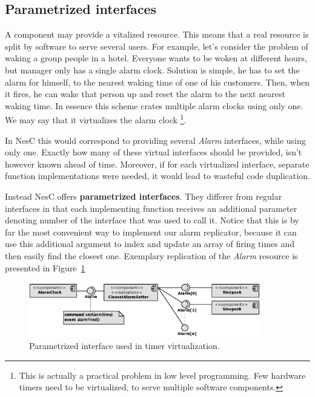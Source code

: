 \subsection{Parametrized interfaces}
A component may provide a vitalized resource. This means that a real
resource is split by software to serve several users. For example,
let's consider the problem of waking a group people in a hotel.
Everyone wants to be woken at different hours, but manager only has a
single alarm clock. Solution is simple, he has to set the alarm for
himself, to the nearest waking time of one of his customers. Then, when it
fires, he can wake that person up and reset the alarm to the next
nearest waking time. In essence this scheme crates multiple alarm
clocks using only one. We may say that it virtualizes the alarm clock
\footnote{This is actually a practical problem in low level
programming. Few hardware timers need to be virtualized, to serve
multiple software components.}.

In NesC this would correspond to providing several \emph{Alarm}
interfaces, while using only one. Exactly how many of these virtual
interfaces should be provided, isn't however known ahead of time.
Moreover, if for each virtualized interface, separate function
implementations were needed, it would lead to wasteful code
duplication.

Instead NesC offers {\bf parametrized interfaces}. They differer from
regular interfaces in that each implementing function receives an
additional parameter denoting number of the interface that was used to
call it. Notice that this is by far the most convenient way to
implement our alarm replicator, because it can use this additional
argument to index and update an array of firing times and then easily
find the closest one. Exemplary replication of the \emph{Alarm}
resource is presented in Figure~\ref{fig:parametrized_interface}

\begin{figure}[h]
  \centering
  \includegraphics[width=0.9\textwidth]{diagrams/parametrized_interface.eps}
  \caption{Parametrized interface used in timer virtualization.}
  \label{fig:parametrized_interface}
\end{figure}

